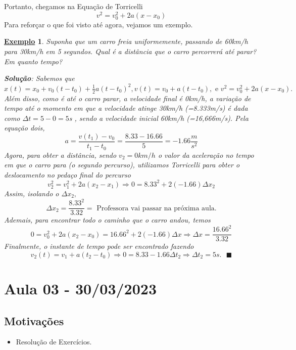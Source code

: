 \documentclass{article}
\newtheorem{example}{\underline{Exemplo}}
\renewcommand\qedsymbol{$\blacksquare$}
\begin{document}
 Portanto, chegamos na Equa\c c\~ao de Torricelli
  $$
  \boxed{v^{2} = v_{0}^{2} + 2a(x-x_{0})}
  $$
  Para refor\c car o que foi visto at\'e agora, vejamos um exemplo.
 \begin{example}
   Suponha que um carro freia uniformemente, passando de 60km/h para 30km/h em 5 segundos. Qual \'e a dist\^ancia
que o carro percorrer\'a at\'e parar? Em quanto tempo?

  \textbf{Solu\c c\~ao}: Sabemos que $x(t) = x_{0} + v_{0}(t-t_{0}) + \frac{1}{2}a(t-t_{0})^{2}, v(t) = v_{0} + a(t-t_{0}),
\text{ e }v^{2} = v_{0}^{2} + 2a(x-x_{0}).$ Al\'em disso, como \'e at\'e o carro parar, a velocidade final \'e 0km/h, a varia\c c\~ao
de tempo at\'e o momento em que a velocidade atinge 30km/h (=8.333m/s) \'e dada como $\Delta t = 5 - 0 = 5$s , sendo a velocidade inicial 60km/h (=16,666m/s). 
Pela equa\c c\~ao dois, 
  $$
    a = \frac{v(t_{1}) - v_{0}}{t_{1}-t_{0}} = \frac{8.33 - 16.66}{5} = -1.66\frac{m}{s^{2}}
  $$
  Agora, para obter a dist\^ancia, sendo $v_{2} = 0km/h$ o valor da acelera\c c\~ao no tempo em que o carro para (o segundo percurso),
utilizamos Torricelli para obter o deslocamento no peda\c co final do percurso
  $$
    v_{2}^{2} = v_{1}^{2} + 2a(x_{2}-x_{1}) \Rightarrow 0 = 8.33^{2} + 2(-1.66)\Delta x_{2}
  $$
  Assim, isolando o $\Delta x_{2},$  
    $$
    \Delta x_{2} = \frac{8.33^{2}}{3.32} = \text{ Professora vai passar na pr\'oxima aula.}
    $$
  Ademais, para encontrar todo o caminho que o carro andou, temos 
    $$
      0 = v_{0}^{2} + 2a(x_{2} - x_{0}) = 16.66^{2} + 2(-1.66)\Delta x \Rightarrow \Delta x = \frac{16.66^{2}}{3.32}
    $$
  Finalmente, o instante de tempo pode ser encontrado fazendo 
    $$
    v_{2}(t) = v_{1} + a(t_{2}-t_{0}) \Rightarrow 0 = 8.33 - 1.66\Delta t_{2} \Rightarrow \Delta t_{2} = 5s.\text{ \qedsymbol}
    $$
 \end{example}
 \newpage

\section{ Aula 03 - 30/03/2023}
\subsection{Motiva\c c\~oes}
 \begin{itemize}
   \item Resolu\c c\~ao de Exerc\'icios.
 \end{itemize}
\end{document}
